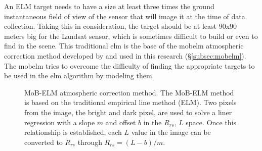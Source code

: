 An ELM target needs to have a size at least three times the ground instantaneous field of view of the sensor that will image it at the time of data collection. Taking this in consideration, the target should be at least 90x90 meters big for the Landsat sensor, which is sometimes difficult to build or even to find in the scene. This traditional \gls{elm} is the base of the \gls{mobelm} atmospheric correction method developed by \citet{Concha2014SPIE} and used in this research (\S\ref{subsec:mobelm}). The \gls{mobelm} tries to overcome the difficulty of finding the appropriate targets to be used in the \gls{elm} algorithm by modeling them.

\begin{figure}[htb]
  \centering
{} %

\caption{MoB-ELM atmospheric correction method. The MoB-ELM method is based on the traditional empirical line method (ELM). Two pixels from the image, the bright and dark pixel, are used to solve a liner regression with a slope $m$ and offset $b$ in the $R_{rs}$, $L$ space. Once this relationship is established, each $L$ value in the image can be converted to $R_{rs}$ through $R_{rs}=(L-b)/m$. \label{fig:ELMregression}}
\end{figure}

